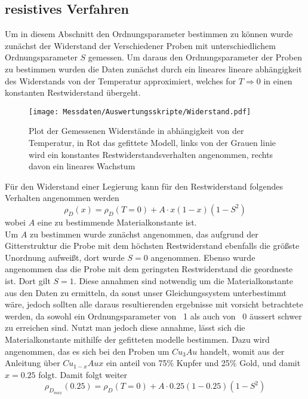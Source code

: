 \subsection{resistives Verfahren}
    Um in diesem Abschnitt den Ordnungsparameter bestimmen zu können wurde zunächst der Widerstand der Verschiedener Proben mit
    unterschiedlichem Ordnungsparameter $S$ gemessen. Um daraus den Ordnungsparameter der Proben zu bestimmen
    wurden die Daten zunächst durch ein lineares lineare abhängigkeit des Widerstands von der Temperatur
    approximiert, welches for $T\Rightarrow 0$ in einen konstanten Restwiderstand übergeht.
    \begin{figure}[H]
        \centering
        \texttt{[image: Messdaten/Auswertungsskripte/Widerstand.pdf]}
        \caption{Plot der Gemessenen Widerstände in abhängigkeit von der Temperatur, in Rot das gefittete Modell, links von der Grauen linie wird
        ein konstantes Restwiderstandsverhalten angenommen, rechts davon ein lineares Wachstum}
        \label{resistance plot}
    \end{figure}
    Für den Widerstand einer Legierung kann für den Restwiderstand folgendes Verhalten angenommen werden
    \begin{equation}
        \rho_D(x) = \rho_D(T=0) + A\cdot x(1-x)(1-S^2)
    \end{equation}
    wobei $A$ eine zu bestimmende Materialkonstante ist.\\
    Um $A$ zu bestimmen wurde zunächst angenommen, das aufgrund der Gitterstruktur die Probe mit dem höchsten
    Restwiderstand ebenfalls die größste Unordnung aufweißt, dort wurde $S=0$ angenommen. Ebenso wurde angenommen
    das die Probe mit dem geringsten Restwiderstand die geordneste ist. Dort gilt $S=1$. Diese annahmen sind
    notwendig um die Materialkonstante aus den Daten zu ermitteln, da sonst unser Gleichungssystem unterbestimmt wäre,
    jedoch sollten alle daraus resultierenden ergebnisse mit vorsicht betrachtete werden, da sowohl ein Ordnungsparameter
    von ~1 als auch von ~0 äussert schwer zu erreichen sind. Nutzt man jedoch diese annahme, lässt sich die Materialkonstante
    mithilfe der gefitteten modelle bestimmen. Dazu wird angenommen, das es sich bei den Proben um $Cu_3Au$ handelt, womit
    aus der Anleitung über $Cu_{1-x}Aux$ ein anteil von 75\% Kupfer und 25\% Gold, und damit $x=0.25$ folgt. Damit folgt weiter
    \begin{equation}
        \rho_{D_{max}}(0.25) = \rho_D(T=0) + A\cdot 0.25(1-0.25)(1-S^2)
    \end{equation} 
